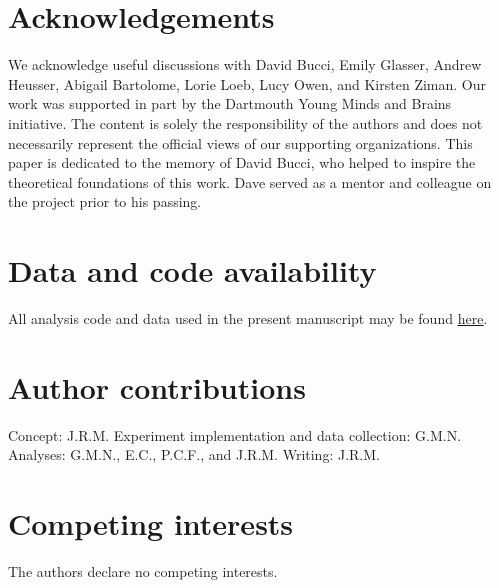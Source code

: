 \documentclass[10pt]{article}
\begin{document}
\section*{Acknowledgements}
We acknowledge useful discussions with David Bucci, Emily Glasser, Andrew Heusser, Abigail Bartolome, Lorie Loeb, Lucy Owen, and Kirsten Ziman.  Our work was supported in part by the Dartmouth Young Minds and Brains initiative.  The content is solely the responsibility of the authors and does not necessarily represent the official views of our supporting organizations.  This paper is dedicated to the memory of David Bucci, who helped to inspire the theoretical foundations of this work.  Dave served as a mentor and colleague on the project prior to his passing.


\section*{Data and code availability}
All analysis code and data used in the present manuscript may be found \href{https://github.com/ContextLab/brainfit-paper}{\underline{here}}.

\section*{Author contributions}
Concept: J.R.M.  Experiment implementation and data collection: G.M.N.
Analyses: G.M.N., E.C., P.C.F., and J.R.M.  Writing: J.R.M.

\section*{Competing interests}
The authors declare no competing interests.



\end{document}
